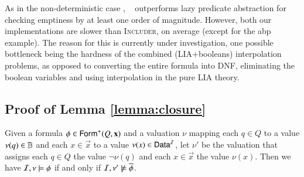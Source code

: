 \documentclass[10pt,conference,letterpaper,twocolumn]{IEEEtran}
\begin{document}
As in the non-deterministic case \cite{mcmillan06}, \impact~
outperforms lazy predicate abstraction for checking emptiness by at
least one order of magnitude. However, both our implementations are
slower than \textsc{Includer}, on average (except for the abp
example). The reason for this is currently under investigation, one
possible bottleneck being the hardness of the combined (LIA+booleans)
interpolation problems, as opposed to converting the entire formula
into DNF, eliminating the boolean variables and using interpolation in
the pure LIA theory.


 

\appendix

\subsection{Proof of Lemma \ref{lemma:closure}}

\begin{proposition}\label{prop:overline}
  Given a formula $\phi \in \mathsf{Form}^+(Q,\mathbf x)$ and a valuation $\nu$
  mapping each $q \in Q$ to a value $\nu(q) \in \mathbb{B}$ and each $x \in
  \vec{x}$ to a value $\nu(x) \in \mathsf{Data}^{\mathcal{I}}$, let $\nu'$ be the
  valuation that assigns each $q \in Q$ the value $\neg\nu(q)$ and
  each $x \in \vec{x}$ the value $\nu(x)$. Then we have 
  $\mathcal{I},\nu \models \phi$ if and only if $\mathcal{I},\nu' \not\models \overline{\phi}$. 
\end{proposition}
\end{document}
